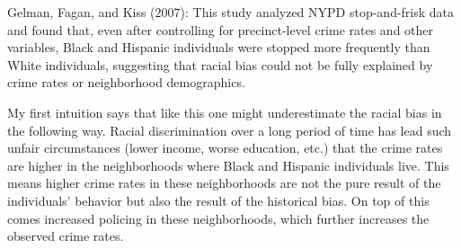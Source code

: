 Gelman, Fagan, and Kiss (2007): This study analyzed NYPD stop-and-frisk data and found that,
even after controlling for precinct-level crime rates and other variables, Black and Hispanic
individuals were stopped more frequently than White individuals, suggesting that racial bias
could not be fully explained by crime rates or neighborhood demographics.

My first intuition says that like this one might underestimate the racial bias in the following way.
Racial discrimination over a long period of time has lead such unfair circumstances
(lower income, worse education, etc.) that the crime rates are higher in the neighborhoods
where Black and Hispanic individuals live. This means higher crime rates in these neighborhoods
are not the pure result of the individuals' behavior but also the result of the historical bias.
On top of this comes increased policing in these neighborhoods, which further increases the observed
crime rates. 
